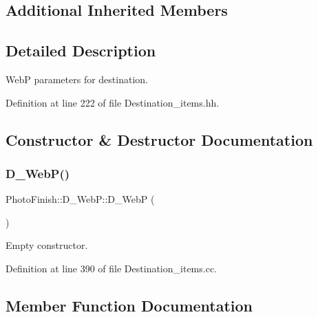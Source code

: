 \subsection*{Additional Inherited Members}


\subsection{Detailed Description}
WebP parameters for destination. 

Definition at line 222 of file Destination\+\_\+items.\+hh.



\subsection{Constructor \& Destructor Documentation}
\mbox{\label{class_photo_finish_1_1_d___web_p_a843064e953a4d950d9197b6cc597113f}} 
\subsubsection{\texorpdfstring{D\+\_\+\+Web\+P()}{D\_WebP()}}
{\footnotesize\ttfamily Photo\+Finish\+::\+D\+\_\+\+Web\+P\+::\+D\+\_\+\+WebP (\begin{DoxyParamCaption}{ }\end{DoxyParamCaption})}



Empty constructor. 



Definition at line 390 of file Destination\+\_\+items.\+cc.



\subsection{Member Function Documentation}
\mbox{\label{class_photo_finish_1_1_d___web_p_a2e30cd1b962996b759cd72046347642b}} 
